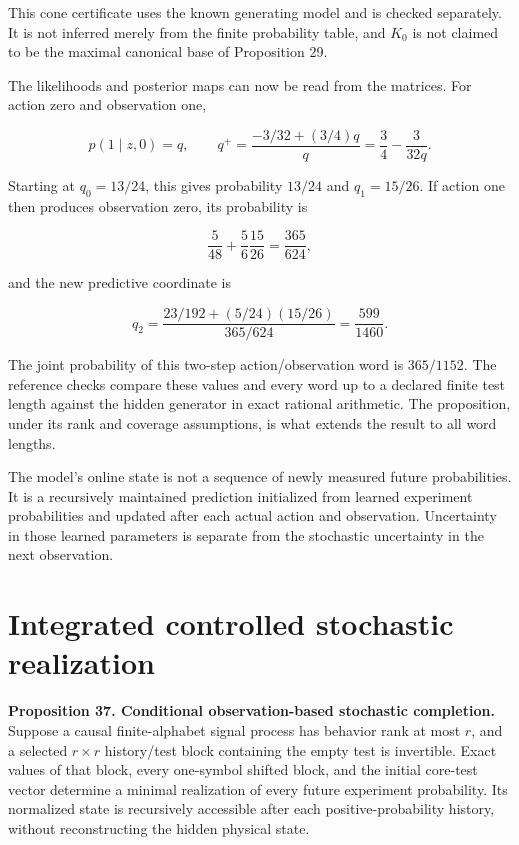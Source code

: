 This cone certificate uses the known generating model and is checked
separately. It is not inferred merely from the finite probability table,
and \(K_0\) is not claimed to be the maximal canonical base of
Proposition 29.

The likelihoods and posterior maps can now be read from the matrices.
For action zero and observation one,

\[
p(1\mid z,0)=q,\qquad
q^+=\frac{-3/32+(3/4)q}{q}
=\frac34-\frac{3}{32q}.
\]

Starting at \(q_0=13/24\), this gives probability \(13/24\) and
\(q_1=15/26\). If action one then produces observation zero, its
probability is

\[
\frac5{48}+\frac56\frac{15}{26}=\frac{365}{624},
\]

and the new predictive coordinate is

\[
q_2=\frac{23/192+(5/24)(15/26)}{365/624}=\frac{599}{1460}.
\]

The joint probability of this two-step action/observation word is
\(365/1152\). The reference checks compare these values and every word
up to a declared finite test length against the hidden generator in
exact rational arithmetic. The proposition, under its rank and coverage
assumptions, is what extends the result to all word lengths.

The model's online state is not a sequence of newly measured future
probabilities. It is a recursively maintained prediction initialized
from learned experiment probabilities and updated after each actual
action and observation. Uncertainty in those learned parameters is
separate from the stochastic uncertainty in the next observation.

\section{Integrated controlled stochastic realization}\label{LSM:integrated-controlled-stochastic-realization}

\textbf{Proposition 37. Conditional observation-based stochastic
completion.} Suppose a causal finite-alphabet signal process has
behavior rank at most \(r\), and a selected \(r\times r\) history/test
block containing the empty test is invertible. Exact values of that
block, every one-symbol shifted block, and the initial core-test vector
determine a minimal realization of every future experiment probability.
Its normalized state is recursively accessible after each
positive-probability history, without reconstructing the hidden physical
state.

